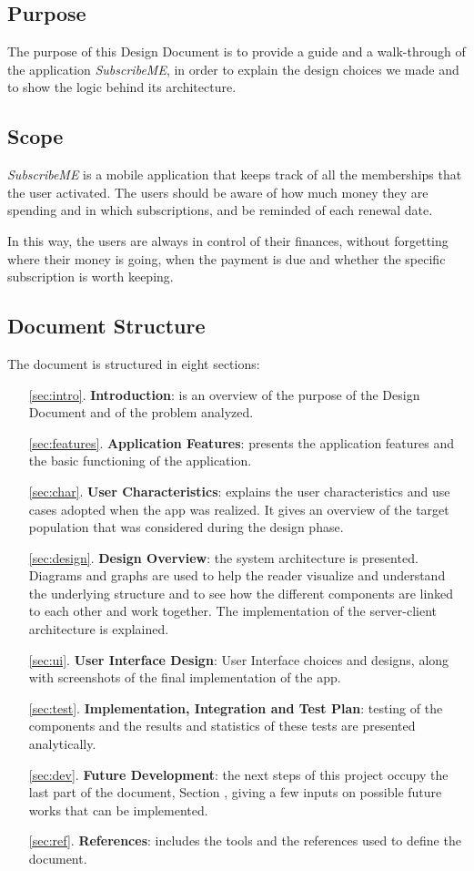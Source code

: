 \documentclass[11pt]{article}
\begin{document}
\subsection{Purpose}
The purpose of this Design Document is to provide a guide and a walk-through of the application \textit{SubscribeME}, in order to explain the design choices we made and to show the logic behind its architecture.

\subsection{Scope}
\textit{SubscribeME} is a mobile application that keeps track of all the memberships that the user activated. The users should be aware of how much money they are spending and in which subscriptions, and be reminded of each renewal date.

In this way, the users are always in control of their finances, without forgetting where their money is going, when the payment is due and whether the specific subscription is worth keeping.

\subsection{Document Structure}
The document is structured in eight sections:
\begin{enumerate}
    \item[\ref{sec:intro}.] \textbf{Introduction}: is an overview of the purpose of the Design Document and of the problem analyzed.
    \item[\ref{sec:features}.] \textbf{Application Features}: presents the application features and the basic functioning of the application.
    \item[\ref{sec:char}.] \textbf{User Characteristics}: explains the user characteristics and use cases adopted when the app was realized. It gives an overview of the target population that was considered during the design phase.
    \item[ \ref{sec:design}.] \textbf{Design Overview}: the system architecture is presented. Diagrams and graphs are used to help the reader visualize and understand the underlying structure and to see how the different components are linked to each other and work together. The implementation of the server-client architecture is explained.
    \item[\ref{sec:ui}.] \textbf{User Interface Design}: User Interface choices and designs, along with screenshots of the final implementation of the app.
    \item[\ref{sec:test}.] \textbf{Implementation, Integration and Test Plan}: testing of the components and the results and statistics of these tests are presented analytically.
    \item[\ref{sec:dev}.] \textbf{Future Development}: the next steps of this project occupy the last part of the document, Section , giving a few inputs on possible future works that can be implemented.
    \item[\ref{sec:ref}.] \textbf{References}: includes the tools and the references used to define the document.
\end{enumerate}
\end{document}
